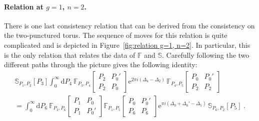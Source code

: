 \documentclass[12pt,a4paper]{article}
\renewcommand\d{\text{d}}
\begin{document}
\paragraph{Relation at $g=1$, $n=2$.} There is one last consistency relation that can be derived from the consistency on the two-punctured torus. The sequence of moves for this relation is quite complicated and is depicted in Figure~\ref{fig:relation g=1, n=2}.
In particular, this is the only relation that relates the data of $\mathbb{F}$ and $\mathbb{S}$. Carefully following the two different paths through the picture gives the following identity:
\begin{multline}
            \mathbb{S}_{P_1,P_2}[P_3] \int_0^\infty\!\! \d P_4 \ \mathbb{F}_{P_3,P_4}\!\begin{bmatrix}
                P_2 & P_0' \\
                P_2 & P_0
            \end{bmatrix}
            \mathrm{e}^{2\pi i  (\Delta_4-\Delta_2)}\, 
        \mathbb{F}_{P_4,P_5}\!\begin{bmatrix}
                P_0 & P_0' \\
                P_2 & P_2
            \end{bmatrix} \\
        =
        \int_0^\infty\!\! \d P_6 \ \mathbb{F}_{P_3,P_6}\!\begin{bmatrix}
            P_1 & P_0 \\
            P_1 & P_0'
        \end{bmatrix}
        \mathbb{F}_{P_1,P_5}\!\begin{bmatrix}
            P_0 & P_0' \\
            P_6 & P_6
        \end{bmatrix} \mathrm{e}^{\pi i (\Delta_0+\Delta_0'-\Delta_5)} \, \mathbb{S}_{P_6,P_2}[P_5]\ .\label{eq:g=1, n=2 relation}
        \end{multline} 
\end{document}
